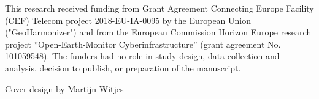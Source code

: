 \vspace*{1cm}
This research received funding from Grant Agreement Connecting Europe Facility (CEF) Telecom project 2018-EU-IA-0095 by the European Union ("GeoHarmonizer") and from the European Commission Horizon Europe research project ”Open-Earth-Monitor Cyberinfrastructure” (grant agreement No. 101059548). The funders had no role in study design, data collection and analysis, decision to publish, or preparation of the manuscript.


\vspace*{\fill}
Cover design by Martijn Witjes